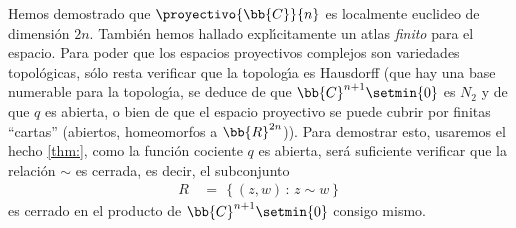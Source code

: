 \begin{ejemplo}
	Hemos demostrado que $\proyectivo{\bb{C}}{n}$ es localmente euclideo
	de dimensi\'{o}n $2n$. Tambi\'{e}n hemos hallado expl\'{\i}citamente
	un atlas \emph{finito} para el espacio. Para poder que los espacios
	proyectivos complejos son variedades topol\'{o}gicas, s\'{o}lo resta
	verificar que la topolog\'{\i}a es Hausdorff (que hay una base
	numerable para la topolog\'{\i}a, se deduce de que
	$\bb{C}^{n+1}\setmin\{0\}$ es $N_{2}$ y de que $q$ es abierta, o
	bien de que el espacio proyectivo se puede cubrir por finitas
	``cartas'' (abiertos, homeomorfos a $\bb{R}^{2n}$)). Para demostrar
	esto, usaremos el hecho \ref{thm:},
	como la funci\'{o}n cociente $q$ es abierta, ser\'{a} suficiente
	verificar que la relaci\'{o}n $\sim$ es cerrada, es decir, el
	subconjunto
	\begin{align*}
		R & \,=\,\left\lbrace (z,w)\,:\,z\sim w\right\rbrace
	\end{align*}
	es cerrado en el producto de $\bb{C}^{n+1}\setmin\{0\}$ consigo
	mismo.


\end{ejemplo}
